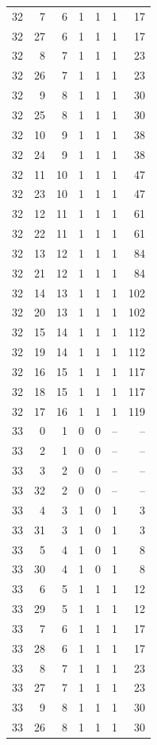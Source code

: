 \begin{longtable}{rrrrrrr}
32 & 7 & 6 & 1 & 1 & 1 & 17\\
32 & 27 & 6 & 1 & 1 & 1 & 17\\
32 & 8 & 7 & 1 & 1 & 1 & 23\\
32 & 26 & 7 & 1 & 1 & 1 & 23\\
32 & 9 & 8 & 1 & 1 & 1 & 30\\
32 & 25 & 8 & 1 & 1 & 1 & 30\\
32 & 10 & 9 & 1 & 1 & 1 & 38\\
32 & 24 & 9 & 1 & 1 & 1 & 38\\
32 & 11 & 10 & 1 & 1 & 1 & 47\\
32 & 23 & 10 & 1 & 1 & 1 & 47\\
32 & 12 & 11 & 1 & 1 & 1 & 61\\
32 & 22 & 11 & 1 & 1 & 1 & 61\\
32 & 13 & 12 & 1 & 1 & 1 & 84\\
32 & 21 & 12 & 1 & 1 & 1 & 84\\
32 & 14 & 13 & 1 & 1 & 1 & 102\\
32 & 20 & 13 & 1 & 1 & 1 & 102\\
32 & 15 & 14 & 1 & 1 & 1 & 112\\
32 & 19 & 14 & 1 & 1 & 1 & 112\\
32 & 16 & 15 & 1 & 1 & 1 & 117\\
32 & 18 & 15 & 1 & 1 & 1 & 117\\
32 & 17 & 16 & 1 & 1 & 1 & 119\\
33 & 0 & 1 & 0 & 0 & -- & --\\
33 & 2 & 1 & 0 & 0 & -- & --\\
33 & 3 & 2 & 0 & 0 & -- & --\\
33 & 32 & 2 & 0 & 0 & -- & --\\
33 & 4 & 3 & 1 & 0 & 1 & 3\\
33 & 31 & 3 & 1 & 0 & 1 & 3\\
33 & 5 & 4 & 1 & 0 & 1 & 8\\
33 & 30 & 4 & 1 & 0 & 1 & 8\\
33 & 6 & 5 & 1 & 1 & 1 & 12\\
33 & 29 & 5 & 1 & 1 & 1 & 12\\
33 & 7 & 6 & 1 & 1 & 1 & 17\\
33 & 28 & 6 & 1 & 1 & 1 & 17\\
33 & 8 & 7 & 1 & 1 & 1 & 23\\
33 & 27 & 7 & 1 & 1 & 1 & 23\\
33 & 9 & 8 & 1 & 1 & 1 & 30\\
33 & 26 & 8 & 1 & 1 & 1 & 30\\

\end{longtable}
